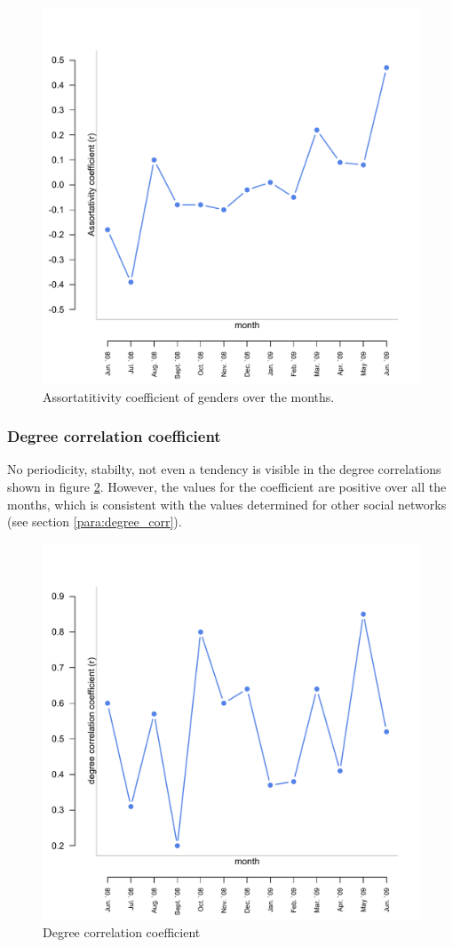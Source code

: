 \begin{figure}[htpb]
\begin{center}
  \includegraphics[width=.6\textwidth]{assets/pdf/long_gender_corr.pdf}
  \caption[Assortatitivity coefficient of genders over the monts]{Assortatitivity coefficient of genders over the months.}
  \label{fig:long_gender_corr}
\end{center}
\end{figure} 


\subsubsection{Degree correlation coefficient}

No periodicity, stabilty, not even a tendency is visible in the degree correlations shown in figure \ref{fig:long_degree_cor}. However, the values for the coefficient are positive over all the months, which is consistent with the values determined for other social networks (see section \ref{para:degree_corr}). 

\begin{figure}[htpb]
\begin{center}
  \includegraphics[width=.6\textwidth]{assets/pdf/long_degree_corr.pdf}
  \caption[Degree correlation coefficient]{Degree correlation coefficient}
  \label{fig:long_degree_cor}
\end{center}
\end{figure} 


